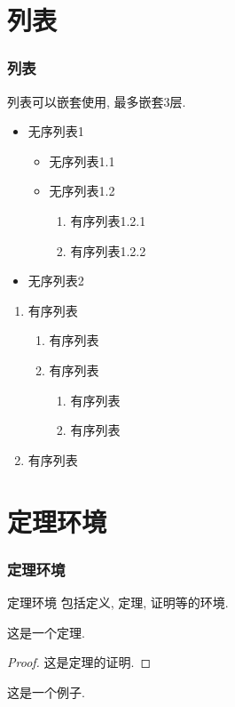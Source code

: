 \documentclass{ctexbeamer}
\begin{document}
\section{列表}
\begin{frame}
    \frametitle{列表}
    列表可以嵌套使用, 最多嵌套3层.
    \begin{itemize}
        \item 无序列表1
        \begin{itemize}
            \item 无序列表1.1
            \item 无序列表1.2
            \begin{enumerate}
                \item 有序列表1.2.1
                \item 有序列表1.2.2
            \end{enumerate}
        \end{itemize}
        \item 无序列表2
    \end{itemize}
    \begin{enumerate}
        \item 有序列表
        \begin{enumerate}
            \item 有序列表
            \item 有序列表
            \begin{enumerate}
                \item 有序列表
                \item 有序列表
            \end{enumerate}
        \end{enumerate}
        \item 有序列表
    \end{enumerate}
\end{frame}
\section{定理环境}
\begin{frame}
    \frametitle{定理环境}
    \begin{definition}
        \alert{定理环境} 包括定义, 定理, 证明等的环境.
    \end{definition}\pause %
    \begin{theorem}
        这是一个定理.
    \end{theorem}\pause
    \begin{proof}
        这是定理的证明.
    \end{proof}\pause
    \begin{example}
        这是一个例子.
    \end{example}
\end{frame}
\end{document}
